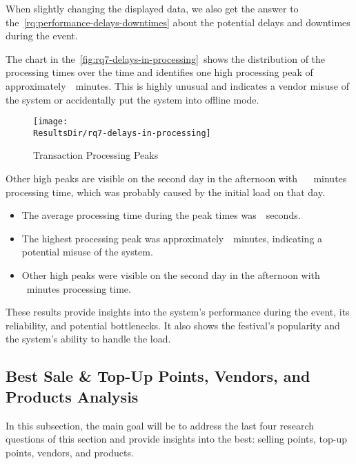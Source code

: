 When slightly changing the displayed data, we also get the answer to the~\autoref{rq:performance-delays-downtimes} about the potential delays and downtimes during the event.


The chart in the~\autoref{fig:rq7-delays-in-processing}~shows the distribution of the processing times over the time and identifies one high processing peak of approximately~~minutes.
This is highly unusual and indicates a vendor misuse of the system or accidentally put the system into offline mode.

\begin{figure}[H]
	\centering
	\texttt{[image: \\ResultsDir/rq7-delays-in-processing]}
	\caption{Transaction Processing Peaks}
	\label{fig:rq7-delays-in-processing}
	\source
\end{figure}

Other high peaks are visible on the second day in the afternoon with ~ ~minutes processing time, which was probably caused by the initial load on that day.

\begin{keytakeaways}
	\begin{itemize}
		\item The average processing time during the peak times was~~seconds.
		\item The highest processing peak was approximately~~minutes, indicating a potential misuse of the system.
		\item Other high peaks were visible on the second day in the afternoon with ~ ~minutes processing time.
	\end{itemize}
\end{keytakeaways}

These results provide insights into the system's performance during the event, its reliability, and potential bottlenecks.
It also shows the festival's popularity and the system's ability to handle the load.


\subsection{Best Sale \& Top-Up Points, Vendors, and Products Analysis}
\label{subsec:analysis-performance-indicators-best}
In this subsection, the main goal will be to address the last four research questions of this section and provide insights into the best: selling points, top-up points, vendors, and products.

